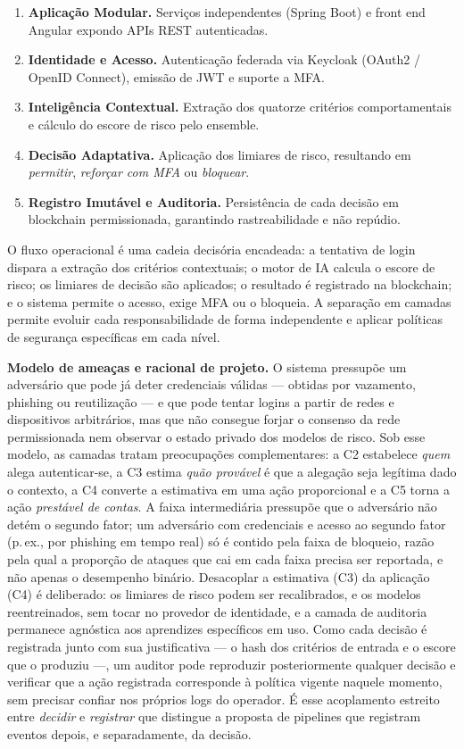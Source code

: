 \documentclass[conference]{IEEEtran}
\begin{document}
\begin{enumerate}
  \item \textbf{Aplicação Modular.} Serviços independentes (Spring Boot)
        e front end Angular expondo APIs REST autenticadas.
  \item \textbf{Identidade e Acesso.} Autenticação federada via Keycloak
        (OAuth2 / OpenID Connect), emissão de JWT e suporte a MFA.
  \item \textbf{Inteligência Contextual.} Extração dos quatorze critérios
        comportamentais e cálculo do escore de risco pelo ensemble.
  \item \textbf{Decisão Adaptativa.} Aplicação dos limiares de risco,
        resultando em \emph{permitir}, \emph{reforçar com MFA} ou
        \emph{bloquear}.
  \item \textbf{Registro Imutável e Auditoria.} Persistência de cada
        decisão em blockchain permissionada, garantindo rastreabilidade
        e não repúdio.
\end{enumerate}

O fluxo operacional é uma cadeia decisória encadeada: a tentativa de
login dispara a extração dos critérios contextuais; o motor de IA calcula
o escore de risco; os limiares de decisão são aplicados; o resultado é
registrado na blockchain; e o sistema permite o acesso, exige MFA ou o
bloqueia. A separação em camadas permite evoluir cada responsabilidade de
forma independente e aplicar políticas de segurança específicas em cada
nível.

\textbf{Modelo de ameaças e racional de projeto.} O sistema pressupõe um
adversário que pode já deter credenciais válidas --- obtidas por
vazamento, phishing ou reutilização --- e que pode tentar logins a partir
de redes e dispositivos arbitrários, mas que não consegue forjar o
consenso da rede permissionada nem observar o estado privado dos modelos
de risco. Sob esse modelo, as camadas tratam preocupações complementares:
a C2 estabelece \emph{quem} alega autenticar-se, a C3 estima \emph{quão
provável} é que a alegação seja legítima dado o contexto, a C4 converte a
estimativa em uma ação proporcional e a C5 torna a ação
\emph{prestável de contas}. A faixa intermediária pressupõe que o
adversário não detém o segundo fator; um adversário com credenciais e
acesso ao segundo fator (p.\,ex., por phishing em tempo real) só é
contido pela faixa de bloqueio, razão pela qual a proporção de ataques
que cai em cada faixa precisa ser reportada, e não apenas o desempenho
binário. Desacoplar a estimativa (C3) da aplicação
(C4) é deliberado: os limiares de risco podem ser recalibrados, e os
modelos reentreinados, sem tocar no provedor de identidade, e a camada de
auditoria permanece agnóstica aos aprendizes específicos em uso. Como
cada decisão é registrada junto com sua justificativa --- o hash dos
critérios de entrada e o escore que o produziu ---, um auditor pode
reproduzir posteriormente qualquer decisão e verificar que a ação
registrada corresponde à política vigente naquele momento, sem precisar
confiar nos próprios logs do operador. É esse acoplamento estreito entre
\emph{decidir} e \emph{registrar} que distingue a proposta de pipelines
que registram eventos depois, e separadamente, da decisão.
\end{document}
